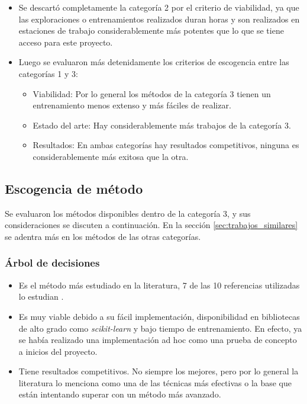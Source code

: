 \begin{itemize}
    \item Se descartó completamente la categoría 2 por el criterio de
      viabilidad, ya que las exploraciones o entrenamientos realizados duran
      horas y son realizados en estaciones de trabajo considerablemente más
      potentes que lo que se tiene acceso para este proyecto.
    \item Luego se evaluaron más detenidamente los criterios de escogencia entre
      las categorías 1 y 3:
    \begin{itemize}
        \item Viabilidad: Por lo general los métodos de la categoría 3 tienen
          un entrenamiento menos extenso y más fáciles de realizar.
        \item Estado del arte: Hay considerablemente más trabajos de la
          categoría 3.
        \item Resultados: En ambas categorías hay resultados competitivos,
          ninguna es considerablemente más exitosa que la otra.
    \end{itemize}
\end{itemize}

\subsection{Escogencia de método}

Se evaluaron los métodos disponibles dentro de la categoría 3, y sus
consideraciones se discuten a continuación. En la sección
\ref{sec:trabajos_similares} se adentra más en los métodos de las otras
categorías.

\subsubsection{Árbol de decisiones}

\begin{itemize}
    \item Es el método más estudiado en la literatura, 7 de las 10 referencias
      utilizadas lo estudian \cite{de_abreu_fast_2021, miyasaka_logic_2021,
      rai_logic_2021, zeng_sampling-based_2021, huang_circuit_2023,
      hu_optdtals_2024, prats_ramos_impact_2024}.
    \item Es muy viable debido a su fácil implementación, disponibilidad en
      bibliotecas de alto grado como \emph{scikit-learn} y bajo tiempo de
      entrenamiento. En efecto, ya se había realizado una implementación ad hoc
      como una prueba de concepto a inicios del proyecto.
    \item Tiene resultados competitivos. No siempre los mejores, pero por lo
      general la literatura lo menciona como una de las técnicas más efectivas
      o la base que están intentando superar con un método más avanzado.
\end{itemize}

